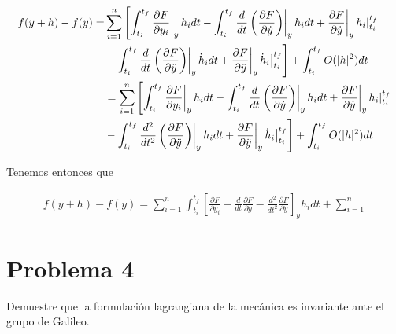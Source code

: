 \documentclass[a4paper,10pt]{article}
\numberwithin{equation}{section}
\newcommand{\zerodel}{.\kern-\nulldelimiterspace}
\begin{document}
\begin{align}
 \begin{split}
  f(y+h) - f(y) =  &\sum_{i=1}^n \left[\int_{t_{i}}^{t_{f}}\left\zerodel\frac{\partial F}{\partial y_i}\right|_y h_i dt 
   - \int_{t_{i}}^{t_{f}} \frac{d}{dt}\left(\left\zerodel\frac{\partial F}{\partial \dot{y}}\right)\right|_y h_i dt + 
  \left\zerodel\frac{\partial F}{\partial \dot{y}}\right|_y \left\zerodel h_i\right|_{t_{i}}^{t_{f}}\right\zerodel \\
  &- \left\zerodel\int_{t_{i}}^{t_{f}} \frac{d}{dt}\left(\left\zerodel\frac{\partial F}{\partial \ddot{y}}\right)\right|_y \dot{h}_i dt + 
  \left\zerodel\frac{\partial F}{\partial \ddot{y}}\right|_y \left\zerodel \dot{h}_i\right|_{t_{i}}^{t_{f}}\right]
  +  \int_{t_{i}}^{t_{f}} O(|h|^2)dt \\
  &= \sum_{i=1}^n\left[\int_{t_{i}}^{t_{f}}\left\zerodel\frac{\partial F}{\partial y_i}\right|_y h_i dt 
   - \int_{t_{i}}^{t_{f}} \frac{d}{dt}\left(\left\zerodel\frac{\partial F}{\partial \dot{y}}\right)\right|_y h_i dt + 
  \left\zerodel\frac{\partial F}{\partial \dot{y}}\right|_y \left\zerodel h_i\right|_{t_{i}}^{t_{f}}\right\zerodel \\
  &-\left\zerodel \int_{t_{i}}^{t_{f}} \frac{d^2}{dt^2}\left(\left\zerodel\frac{\partial F}{\partial \ddot{y}}\right)\right|_y h_i dt + 
  \left\zerodel\frac{\partial F}{\partial \ddot{y}}\right|_y \left\zerodel \dot{h}_i\right|_{t_{i}}^{t_{f}}\right]
  +  \int_{t_{i}}^{t_{f}} O(|h|^2)dt
 \end{split}
\end{align}

Tenemos entonces que 

\begin{align*}
 f(y+h) - f(y) = \sum_{i=1}^n \int_{t_{i}}^{t_{f}} \left[\frac{\partial F}{\partial y_i}  - 
 \frac{d}{dt}\frac{\partial F}{\partial \dot{y}}  
 - \frac{d^2}{dt^2}\frac{\partial F}{\partial \ddot{y}} \right]_y h_i dt 
 + \sum_{i=1}^n 
\end{align*}





\section{Problema 4}

Demuestre que la formulación lagrangiana de la mecánica es invariante ante el grupo 
de Galileo.

\vspace{.3cm}
\end{document}

